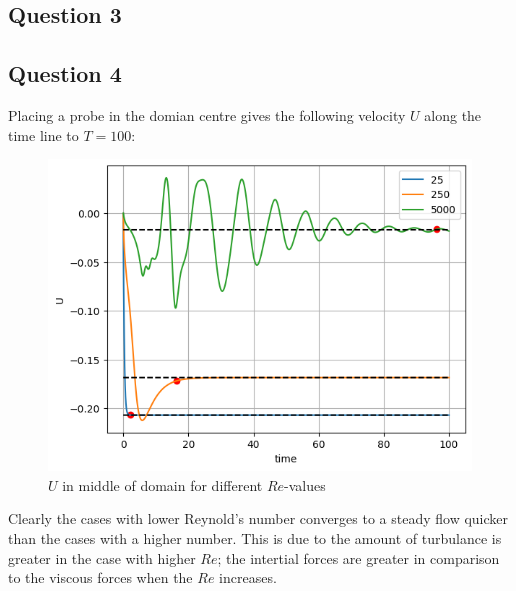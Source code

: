 \documentclass[10pt]{report}
\begin{document}
\subsection*{Question 3}
\subsection*{Question 4}
Placing a probe in the domian centre gives the following velocity $U$ along the time line to $T = 100$:
\begin{figure}[H]
    \centering
    \includegraphics[width = \textwidth]{plots/plot1.png}
    \caption{$U$ in middle of domain for different $Re$-values}
    \label{plot1}
\end{figure}
Clearly the cases with lower Reynold's number converges to a steady flow quicker than the cases with
a higher number. This is due to the amount of turbulance is greater in the case with higher $Re$; 
the intertial forces are greater in comparison to the viscous forces when the $Re$ increases.
\end{document}
